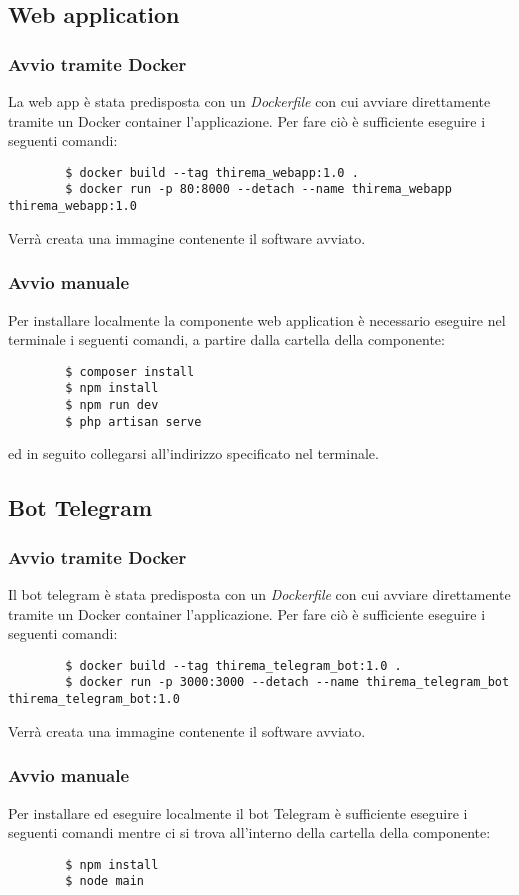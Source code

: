 	\subsection{Web application}

		\subsubsection{Avvio tramite Docker}
		La web app è stata predisposta con un \textit{Dockerfile} con cui avviare direttamente tramite un Docker container l'applicazione. Per fare ciò è sufficiente eseguire i seguenti comandi:
		\begin{verbatim}
		$ docker build --tag thirema_webapp:1.0 .
		$ docker run -p 80:8000 --detach --name thirema_webapp thirema_webapp:1.0
		\end{verbatim}
		Verrà creata una immagine contenente il software avviato.

		\subsubsection{Avvio manuale}
		Per installare localmente la componente web application è necessario eseguire nel terminale i seguenti comandi, a partire dalla cartella della componente:
		\begin{verbatim}
		$ composer install
		$ npm install
		$ npm run dev
		$ php artisan serve
		\end{verbatim}
		ed in seguito collegarsi all'indirizzo specificato nel terminale.

	\subsection{Bot Telegram}

		\subsubsection{Avvio tramite Docker}
		Il bot telegram è stata predisposta con un \textit{Dockerfile} con cui avviare direttamente tramite un Docker container l'applicazione. Per fare ciò è sufficiente eseguire i seguenti comandi:
		\begin{verbatim}
		$ docker build --tag thirema_telegram_bot:1.0 .
		$ docker run -p 3000:3000 --detach --name thirema_telegram_bot thirema_telegram_bot:1.0
		\end{verbatim}
		Verrà creata una immagine contenente il software avviato.

		\subsubsection{Avvio manuale}
		Per installare ed eseguire localmente il bot Telegram è sufficiente eseguire i seguenti comandi mentre ci si trova all'interno della cartella della componente:
		\begin{verbatim}
		$ npm install
		$ node main
		\end{verbatim}
		
